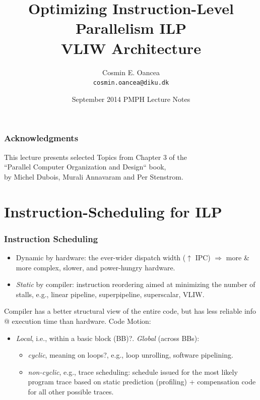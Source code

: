 \documentclass{beamer}
\title[VLIW Arch]{Optimizing Instruction-Level Parallelism ILP\\VLIW Architecture}
\author[C.~Oancea]{Cosmin E. Oancea\\{\tt cosmin.oancea@diku.dk}}
\institute{Department of Computer Science (DIKU)\\University of Copenhagen}
\date[Sept 2014]{September 2014 PMPH Lecture Notes}
\renewcommand{\emph}[1]{\textcolor{structure}{#1}}
\newcommand{\emp}[1]{\textcolor{DikuRed}{ #1}}
\begin{document}
\titleslide



\begin{frame}
\frametitle{Acknowledgments}
This lecture presents selected Topics from Chapter 3 of the\\
``Parallel Computer Organization and Design`` book,\\
by Michel Dubois, Murali Annavaram and Per Stenstrom.
\end{frame}


\begin{frame}[fragile]
	\tableofcontents
\end{frame}


\section{Instruction-Scheduling for ILP}


\begin{frame}[fragile,t]
\frametitle{Instruction Scheduling}

\begin{itemize}
    \item {Dynamic} by hardware: the ever-wider dispatch width
            ($\uparrow$ IPC) $\Rightarrow$ 
            more \& more complex, slower, and power-hungry hardware. \smallskip
 
    \item {\em Static} by compiler: instruction reordering aimed at
            minimizing the number of stalls,
            e.g., linear pipeline, superpipeline, superscalar, VLIW.  
\end  {itemize}
\pause\bigskip

Compiler has a better structural view of the entire code, but has less reliable info 
@ execution time than hardware. Code Motion:
\smallskip
\begin{itemize}
    \item \emph{\em Local}, i.e., within a \alert{basic block (BB)?}. \emph{\em Global} (across BBs): 
    \begin{itemize}
        \item \emp{\em cyclic}, meaning on \alert{loops?}, e.g., loop unrolling, software pipelining.
        \item \emp{\em non-cyclic}, e.g., trace scheduling: schedule issued for the most likely 
                program trace based on static prediction (profiling) + compensation code 
                for all other possible traces.
    \end  {itemize}
\end  {itemize}

\end{frame}
\end{document}
